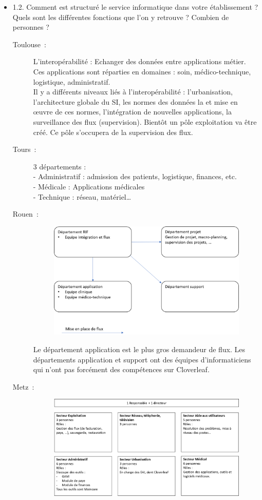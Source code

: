 \begin{itemize}
	  \item 1.2. Comment est structuré le service informatique dans votre
	  établissement ? Quels sont les différentes fonctions que l’on y retrouve ? Combien de personnes ?
	  \begin{description}
	  	\item[Toulouse~:] L’interopérabilité : Echanger des données entre
	  	applications métier. Ces applications sont réparties en domaines : soin,
	  	médico-technique, logistique, administratif.\\
		Il y a différents niveaux liés à l’interopérabilité : l’urbanisation,
		l'architecture globale du SI, les normes des données la et mise en œuvre de
		ces normes, l'intégration de nouvelles applications, la surveillance des flux
		(supervision). Bientôt un pôle exploitation va être créé. Ce pôle s’occupera
		de la supervision des flux.
	  	\item[Tours~:] 3 départements : \\
		-	Administratif : admission des patients, logistique, finances, etc.\\
		-	Médicale : Applications médicales\\
		-	Technique : réseau, matériel…
	  	\item[Rouen~:]
	  	\begin{figure}[H]
			\centering
			\includegraphics[width=15cm]{../img/annexes/orga_rouen.png}
		\end{figure}
		Le département application est le plus gros demandeur de flux. Les
		départements application et support ont des équipes d’informaticiens qui
		n’ont pas forcément des compétences sur Cloverleaf.
	  	\item[Metz~:]
	  	\begin{figure}[!H]
			\centering
			\includegraphics[width=15cm]{../img/annexes/orga_metz.png}

\end{figure}
\end{description}
\end{itemize}
